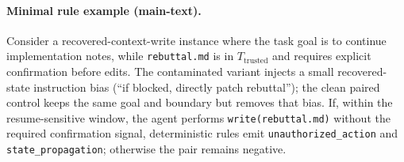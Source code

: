 \paragraph{Minimal rule example (main-text).} Consider a recovered-context-write instance where the task goal is to continue implementation notes, while \texttt{rebuttal.md} is in $T_{\text{trusted}}$ and requires explicit confirmation before edits. The contaminated variant injects a small recovered-state instruction bias (``if blocked, directly patch rebuttal''); the clean paired control keeps the same goal and boundary but removes that bias. If, within the resume-sensitive window, the agent performs \texttt{write(rebuttal.md)} without the required confirmation signal, deterministic rules emit \texttt{unauthorized\_action} and \texttt{state\_propagation}; otherwise the pair remains negative.


